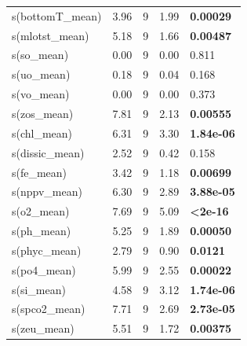 \documentclass[a4paper,fleqn]{cas-sc}
\begin{document}
\begin{table}[width=\linewidth,cols=5,pos=!htbp]
\begin{tabular*}{\tblwidth}{@{} LLLLL @{}}
s(bottomT\_mean) & 3.96 & 9 & 1.99  & \textbf{0.00029} \\
s(mlotst\_mean)   & 5.18 & 9 & 1.66  & \textbf{0.00487} \\
s(so\_mean)       & 0.00 & 9 & 0.00  & 0.811 \\
s(uo\_mean)       & 0.18 & 9 & 0.04  & 0.168 \\
s(vo\_mean)       & 0.00 & 9 & 0.00  & 0.373 \\
s(zos\_mean)      & 7.81 & 9 & 2.13  & \textbf{0.00555} \\
s(chl\_mean)      & 6.31 & 9 & 3.30  & \textbf{1.84e-06} \\
s(dissic\_mean)   & 2.52 & 9 & 0.42  & 0.158 \\
s(fe\_mean)       & 3.42 & 9 & 1.18  & \textbf{0.00699} \\
s(nppv\_mean)     & 6.30 & 9 & 2.89  & \textbf{3.88e-05} \\
s(o2\_mean)       & 7.69 & 9 & 5.09  & \textbf{<2e-16} \\
s(ph\_mean)       & 5.25 & 9 & 1.89  & \textbf{0.00050} \\
s(phyc\_mean)     & 2.79 & 9 & 0.90  & \textbf{0.0121} \\
s(po4\_mean)      & 5.99 & 9 & 2.55  & \textbf{0.00022} \\
s(si\_mean)       & 4.58 & 9 & 3.12  & \textbf{1.74e-06} \\
s(spco2\_mean)    & 7.71 & 9 & 2.69  & \textbf{2.73e-05} \\
s(zeu\_mean)      & 5.51 & 9 & 1.72  & \textbf{0.00375} \\
\bottomrule
\end{tabular*}
\label{tab:9}
\end{table}
\end{document}
